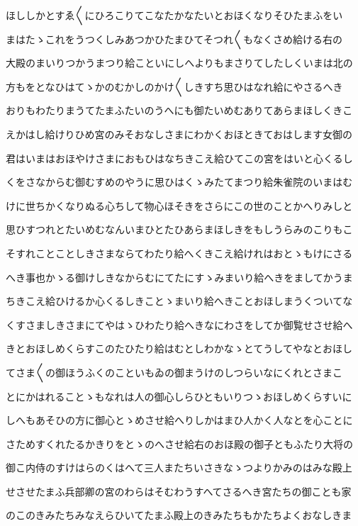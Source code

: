 \documentclass[a4paper,11pt,landscape]{ltjtarticle}
\begin{document}
ほししかとすゑ〱にひろこりてこなたかなたいとおほくなりそひたまふをい
\par\medskip
まはたゝこれをうつくしみあつかひたまひてそつれ〱もなくさめ給ける右の
\par\medskip
大殿のまいりつかうまつり給こといにしへよりもまさりてしたしくいまは北の
\par\medskip
方もをとなひはてゝかのむかしのかけ〱しきすち思ひはなれ給にやさるへき
\par\medskip
おりもわたりまうてたまふたいのうへにも御たいめむありてあらまほしくきこ
\par\medskip
えかはし給けりひめ宮のみそおなしさまにわかくおほときておはします女御の
\par\medskip
君はいまはおほやけさまにおもひはなちきこえ給ひてこの宮をはいと心くるし
\par\medskip
くをさなからむ御むすめのやうに思ひはくゝみたてまつり給朱雀院のいまはむ
\par\medskip
けに世ちかくなりぬる心ちして物心ほそきをさらにこの世のことかへりみしと
\par\medskip
思ひすつれとたいめむなんいまひとたひあらまほしきをもしうらみのこりもこ
\par\medskip
そすれことことしきさまならてわたり給へくきこえ給けれはおとゝもけにさる
\par\medskip
へき事也かゝる御けしきなからむにてたにすゝみまいり給へきをましてかうま
\par\medskip
ちきこえ給ひけるか心くるしきことゝまいり給へきことおほしまうくついてな
\par\medskip
くすさましきさまにてやはゝひわたり給へきなにわさをしてか御覧せさせ給へ
\par\medskip
きとおほしめくらすこのたひたり給はむとしわかなゝとてうしてやなとおほし
\par\medskip
てさま〱の御ほうふくのこといもゐの御まうけのしつらいなにくれとさまこ
\par\medskip
とにかはれることゝもなれは人の御心しらひともいりつゝおほしめくらすいに
\par\medskip
しへもあそひの方に御心とゝめさせ給へりしかはまひ人かく人なとを心ことに
\par\medskip
さためすくれたるかきりをとゝのへさせ給右のおほ殿の御子ともふたり大将の
\par\medskip
御こ内侍のすけはらのくはへて三人またちいさきなゝつよりかみのはみな殿上
\par\medskip
せさせたまふ兵部卿の宮のわらはそむわうすへてさるへき宮たちの御ことも家
\par\medskip
のこのきみたちみなえらひいてたまふ殿上のきみたちもかたちよくおなしきま
\end{document}
